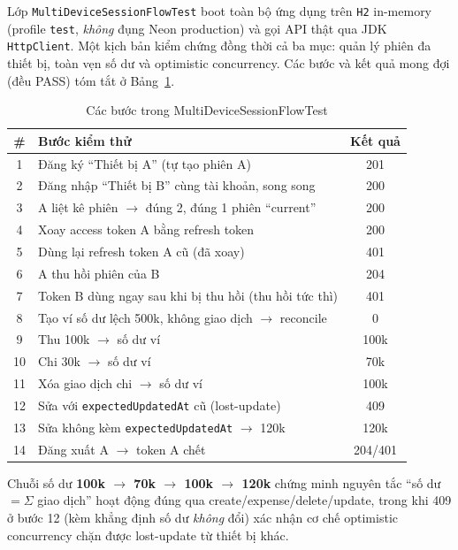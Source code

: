 \documentclass[11pt,a4paper]{article}
\begin{document}
Lớp \texttt{MultiDeviceSessionFlowTest} boot toàn bộ ứng dụng trên \texttt{H2} in-memory
(profile \texttt{test}, \emph{không} đụng Neon production) và gọi API thật qua JDK
\texttt{HttpClient}. Một kịch bản kiểm chứng đồng thời cả ba mục: quản lý phiên đa thiết bị,
toàn vẹn số dư và optimistic concurrency. Các bước và kết quả mong đợi (đều PASS) tóm tắt ở
Bảng~\ref{tab:test}.

\begin{table}[ht]
\centering
\caption{Các bước trong MultiDeviceSessionFlowTest}
\label{tab:test}
\begin{tabular}{@{}clc@{}}
\toprule
\textbf{\#} & \textbf{Bước kiểm thử} & \textbf{Kết quả} \\
\midrule
1  & Đăng ký ``Thiết bị A'' (tự tạo phiên A)                       & 201 \\
2  & Đăng nhập ``Thiết bị B'' cùng tài khoản, song song           & 200 \\
3  & A liệt kê phiên $\rightarrow$ đúng 2, đúng 1 phiên ``current'' & 200 \\
4  & Xoay access token A bằng refresh token                       & 200 \\
5  & Dùng lại refresh token A cũ (đã xoay)                         & 401 \\
6  & A thu hồi phiên của B                                         & 204 \\
7  & Token B dùng ngay sau khi bị thu hồi (thu hồi tức thì)        & 401 \\
8  & Tạo ví số dư lệch 500k, không giao dịch $\rightarrow$ reconcile & 0 \\
9  & Thu 100k $\rightarrow$ số dư ví                               & 100k \\
10 & Chi 30k $\rightarrow$ số dư ví                                & 70k \\
11 & Xóa giao dịch chi $\rightarrow$ số dư ví                      & 100k \\
12 & Sửa với \texttt{expectedUpdatedAt} cũ (lost-update)          & 409 \\
13 & Sửa không kèm \texttt{expectedUpdatedAt} $\rightarrow$ 120k   & 120k \\
14 & Đăng xuất A $\rightarrow$ token A chết                        & 204/401 \\
\bottomrule
\end{tabular}
\end{table}

\noindent Chuỗi số dư \textbf{100k $\rightarrow$ 70k $\rightarrow$ 100k $\rightarrow$ 120k}
chứng minh nguyên tắc ``số dư $=\Sigma$ giao dịch'' hoạt động đúng qua create/expense/delete/update,
trong khi 409 ở bước 12 (kèm khẳng định số dư \emph{không} đổi) xác nhận cơ chế optimistic
concurrency chặn được lost-update từ thiết bị khác.
\end{document}
